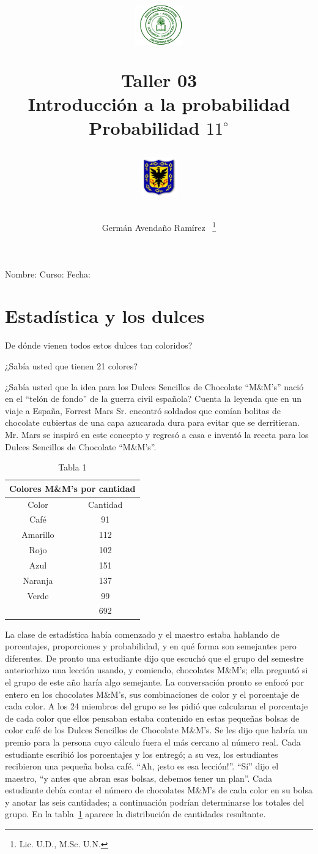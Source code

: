 \documentclass[10pt,twoside]{article}
\author{Germ\'an Avenda\~no Ram\'irez ~\thanks{Lic. U.D., M.Sc. U.N.}}
\title{\begin{minipage}{.2\textwidth}
\includegraphics[height=1.75cm]{Images/logo-colegio.png}\end{minipage}
\begin{minipage}{.55\textwidth}
\begin{center}
Taller 03\\
Introducción a la probabilidad\\
Probabilidad $11^{\circ}$
\end{center}
\end{minipage}\hfill
\begin{minipage}{.2\textwidth}
\includegraphics[height=1.75cm]{Images/logo-sed.png} 
\end{minipage}}
\date{}
\begin{document}
\maketitle
Nombre: \hrulefill Curso: \underline{\hspace*{44pt}} Fecha: \underline{\hspace*{2.5cm}}
\section*{Estad\'istica y los dulces}
De dónde vienen todos estos dulces tan coloridos?

¿Sabía usted que tienen 21 colores?

¿Sabía usted que la idea para los Dulces Sencillos de Chocolate “M\&M’s” nació
en el “telón de fondo” de la guerra civil española? Cuenta la leyenda que en un
viaje a España, Forrest Mars Sr. encontró soldados que comían bolitas de chocolate
cubiertas de una capa azucarada dura para evitar que se derritieran. Mr. Mars se
inspiró en este concepto y regresó a casa e inventó la receta para los Dulces Sencillos de Chocolate “M\&M’s”.
\begin{table}[h!]
\centering
\begin{tabular}{cc}
\multicolumn{2}{c}{Colores M\&M's por cantidad} \\ \hline
Color & Cantidad \\ \hline
Café & 91 \\ 
Amarillo & 112 \\ 
Rojo & 102 \\ 
Azul & 151 \\ 
Naranja & 137 \\ 
Verde & 99 \\ \cline{2-2}
 & 692 \\ 
\hline
\end{tabular}
\caption{Tabla 1} \label{tab1}
\end{table}

La clase de estadística había comenzado y el maestro estaba hablando de porcentajes, proporciones y probabilidad, y en qué forma son semejantes pero diferentes. De pronto una estudiante dijo que escuchó que el grupo del semestre anteriorhizo una lección usando, y comiendo, chocolates M\&M’s; ella preguntó si el grupo
de este año haría algo semejante. La conversación pronto se enfocó por entero en los chocolates M\&M’s, sus combinaciones de color y el porcentaje de cada color. A los 24 miembros del grupo se les pidió que calcularan el porcentaje de cada color que ellos pensaban estaba contenido en estas pequeñas bolsas de color café de los
Dulces Sencillos de Chocolate M\&M’s. Se les dijo que habría un premio para la persona cuyo cálculo fuera el más cercano al número real. Cada estudiante escribió los porcentajes y los entregó; a su vez, los estudiantes recibieron una pequeña bolsa café. “Ah, ¡esto es esa lección!”. “Sí” dijo el maestro, “y antes que abran esas
bolsas, debemos tener un plan”. Cada estudiante debía contar el número de chocolates M\&M's de cada color en su bolsa y anotar las seis cantidades; a continuación podrían determinarse los totales del grupo. En la tabla~\ref{tab1} aparece la distribución de cantidades resultante.
\end{document}
